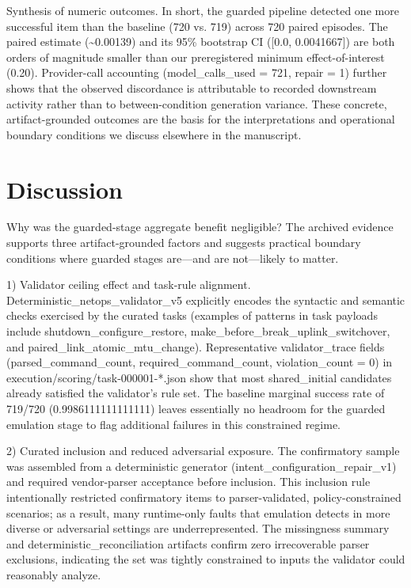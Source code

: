 \documentclass[conference]{IEEEtran}
\begin{document}
Synthesis of numeric outcomes. In short, the guarded pipeline detected one more successful item than the baseline (720 vs. 719) across 720 paired episodes. The paired estimate (\textasciitilde{}0.00139) and its 95\% bootstrap CI ([0.0, 0.0041667]) are both orders of magnitude smaller than our preregistered minimum effect-of-interest (0.20). Provider-call accounting (model\_calls\_used = 721, repair = 1) further shows that the observed discordance is attributable to recorded downstream activity rather than to between-condition generation variance. These concrete, artifact-grounded outcomes are the basis for the interpretations and operational boundary conditions we discuss elsewhere in the manuscript.

\section{Discussion}
Why was the guarded-stage aggregate benefit negligible? The archived evidence supports three artifact-grounded factors and suggests practical boundary conditions where guarded stages are---and are not---likely to matter.

1) Validator ceiling effect and task-rule alignment. Deterministic\_netops\_validator\_v5 explicitly encodes the syntactic and semantic checks exercised by the curated tasks (examples of patterns in task payloads include shutdown\_configure\_restore, make\_before\_break\_uplink\_switchover, and paired\_link\_atomic\_mtu\_change). Representative validator\_trace fields (parsed\_command\_count, required\_command\_count, violation\_count = 0) in execution/scoring/task-000001-*.json show that most shared\_initial candidates already satisfied the validator's rule set. The baseline marginal success rate of 719/720 (0.9986111111111111) leaves essentially no headroom for the guarded emulation stage to flag additional failures in this constrained regime.

2) Curated inclusion and reduced adversarial exposure. The confirmatory sample was assembled from a deterministic generator (intent\_configuration\_repair\_v1) and required vendor-parser acceptance before inclusion. This inclusion rule intentionally restricted confirmatory items to parser-validated, policy-constrained scenarios; as a result, many runtime-only faults that emulation detects in more diverse or adversarial settings are underrepresented. The missingness summary and deterministic\_reconciliation artifacts confirm zero irrecoverable parser exclusions, indicating the set was tightly constrained to inputs the validator could reasonably analyze.
\end{document}

